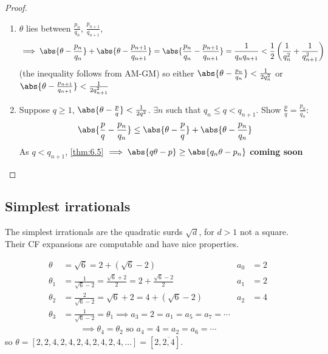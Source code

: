 \documentclass{article}
\begin{document}
\begin{proof}
    \leavevmode
    \begin{enumerate}[label=(\roman*)]
        \item $\theta$ lies between $\frac{p_n}{q_n}$, $\frac{p_{n+1}}{q_{n+1}}$,
            \begin{equation*}
                \implies \abs{\theta - \frac{p_n}{q_n}} + \abs{\theta - \frac{p_{n+1}}{q_{n+1}}} = \abs{\frac{p_n}{q_n} - \frac{p_{n+1}}{q_{n+1}}} = \frac{1}{q_n q_{n+1}} < \frac{1}{2} \left(\frac{1}{q_n^2} + \frac{1}{q_{n+1}^2}\right)
            \end{equation*}
            (the inequality follows from AM-GM)
            so either $\abs{\theta - \frac{p_n}{q_n}} < \frac{1}{2 q_n^2}$ or $\abs{\theta - \frac{p_{n+1}}{q_{n+1}}} < \frac{1}{2 q_{n+1}^2}$
        \item Suppose $q \geq 1$, $\abs{\theta - \frac{p}{q}} < \frac{1}{2 q^2}$. $\exists n$ such that $q_n \leq q < q_{n+1}$. Show $\frac{p}{q} = \frac{p_n}{q_n}$:
            \begin{equation*}
                \abs{\frac{p}{q} - \frac{p_n}{q_n}} \leq \abs{\theta - \frac{p}{q}} + \abs{\theta - \frac{p_n}{q_n}}
            \end{equation*}
            As $q < q_{n+1}$, \cref{thm:6.5} $\implies \abs{q \theta - p} \geq \abs{q_n \theta - p_n}$
            \textbf{coming soon}
    \end{enumerate}
\end{proof}

\subsection*{Simplest irrationals}
The simplest irrationals are the quadratic surds $\sqrt{d}$, for $d>1$ not a square.
Their CF expansions are computable and have nice properties.
\begin{eg}
    \begin{align*}
        \theta &= \sqrt{6} = 2 + (\sqrt{6} - 2) & a_0&=2 \\
        \theta_1 &= \frac{1}{\sqrt{6}-2} = \frac{\sqrt{6} + 2}{2} = 2 + \frac{\sqrt{6}-2}{2} & a_1&=2\\
        \theta_2 &= \frac{2}{\sqrt{6}-2} = \sqrt{6}+2 = 4 + (\sqrt{6} - 2) & a_2&=4 \\
        \theta_3 &= \frac{1}{\sqrt{6}-2} = \theta_1 \implies a_3 = 2 = a_1 = a_5 = a_7 = \dotsb&& \\
                 & \qquad \implies \theta_4 = \theta_2 \text{ so } a_4 = 4 = a_2 = a_6 = \dotsb
    \end{align*}
    so $\theta = [2, 2, 4, 2, 4, 2, 4, 2, 4, 2, 4, \dotsc] = [2, \overline{2, 4}]$.
\end{eg}
\end{document}
